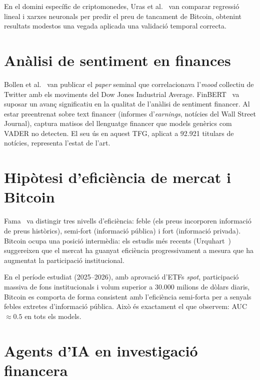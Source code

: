 \documentclass[12pt, a4paper]{report}
\begin{document}
En el domini específic de criptomonedes, Uras et al.~\cite{uras2020} van comparar regressió lineal i xarxes neuronals per predir el preu de tancament de Bitcoin, obtenint resultats modestos una vegada aplicada una validació temporal correcta.

\section{Anàlisi de sentiment en finances}

Bollen et al.~\cite{bollen2011} van publicar el \textit{paper} seminal que correlacionava l'\textit{mood} col\textperiodcentered{}lectiu de Twitter amb els moviments del Dow Jones Industrial Average. FinBERT~\cite{liu2020} va suposar un avanç significatiu en la qualitat de l'anàlisi de sentiment financer. Al estar preentrenat sobre text financer (informes d'\textit{earnings}, notícies del Wall Street Journal), captura matisos del llenguatge financer que models genèrics com VADER no detecten. El seu ús en aquest TFG, aplicat a 92.921 titulars de notícies, representa l'estat de l'art.

\section{Hipòtesi d'eficiència de mercat i Bitcoin}

Fama~\cite{fama1970} va distingir tres nivells d'eficiència: feble (els preus incorporen informació de preus històrics), semi-fort (informació pública) i fort (informació privada). Bitcoin ocupa una posició intermèdia: els estudis més recents (Urquhart~\cite{urquhart2016}) suggereixen que el mercat ha guanyat eficiència progressivament a mesura que ha augmentat la participació institucional.

\begin{infobox}
En el període estudiat (2025--2026), amb aprovació d'ETFs \textit{spot}, participació massiva de fons institucionals i volum superior a 30.000 milions de dòlars diaris, Bitcoin es comporta de forma consistent amb l'eficiència semi-forta per a senyals febles extretes d'informació pública. Això és exactament el que observem: AUC $\approx 0.5$ en tots els models.
\end{infobox}

\section{Agents d'IA en investigació financera}
\end{document}
